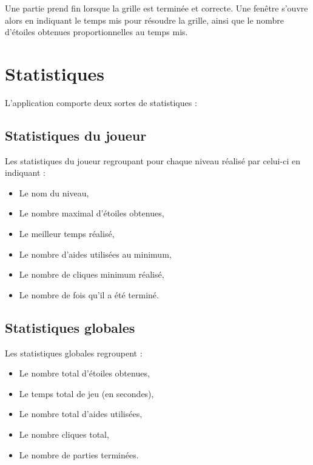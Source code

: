\documentclass[a4paper, 12pt]{report}
\begin{document}
            Une partie prend fin lorsque la grille est terminée et correcte. Une fenêtre s'ouvre alors en indiquant le temps mis pour résoudre la grille, ainsi que le nombre d'étoiles obtenues proportionnelles au temps mis.
 
            
	
	\section{Statistiques}

		L'application comporte deux sortes de statistiques : 
		
		\subsection{Statistiques du joueur}
		
		    Les statistiques du joueur regroupant pour chaque niveau réalisé par celui-ci en indiquant :
		    \begin{itemize}
                    \item Le nom du niveau,
                    \item Le nombre maximal d'étoiles obtenues,
                    \item Le meilleur temps réalisé,
                    \item Le nombre d'aides utilisées au minimum,
                    \item Le nombre de cliques minimum réalisé,
                    \item Le nombre de fois qu'il a été terminé.
            \end{itemize}
		    
		
		
		\subsection{Statistiques globales}

		    Les statistiques globales regroupent :
		    \begin{itemize}
                    \item Le nombre total d'étoiles obtenues,
                    \item Le temps total de jeu (en secondes),
                    \item Le nombre total d'aides utilisées,
                    \item Le nombre cliques total,
                    \item Le nombre de parties terminées.
            \end{itemize}
            
    
		    

		
		
\end{document}
